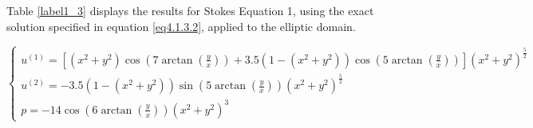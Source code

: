 \documentclass{article}
\begin{document}
Table \ref{label1_3} displays the results for Stokes Equation 1, using the exact solution specified in equation \eqref{eq4.1.3.2}, applied to the elliptic domain.

\begin{equation} \label{eq4.1.3.2}
\begin{cases} 
u^{(1)} = [(x^2 + y^2) \cos(7 \arctan(\frac{y}{x})) + 3.5 (1 - (x^2 + y^2)) \cos(5 \arctan(\frac{y}{x}))] (x^2 + y^2) ^ {\frac{5}{2}} \\
u^{(2)} = -3.5 (1 - (x^2 + y^2)) \sin(5\arctan(\frac{y}{x})) (x^2 + y^2) ^ {\frac{5}{2}}\\
p = -14 \cos(6 \arctan(\frac{y}{x}) ) (x^2 + y^2) ^ 3
\end{cases}
\end{equation}
\end{document}
